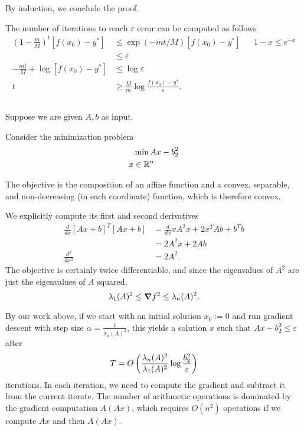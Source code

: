 \documentclass[10pt]{article}
\let\norm\relax
\DeclarePairedDelimiter{\norm}{\lVert}{\rVert}
\newcommand{\R}{\mathbb{R}}
\begin{document}
By induction,
we conclude the proof.

The number of iterations to reach $\varepsilon$ error can be computed as follows
\begin{align*}
  \left( 1-\frac{m}M \right)^t [f(x_0) - y^*]
  &\leq \exp(-mt/M) [f(x_0) - y^*] &&1-x\leq e^{-x} \\
  &\leq \varepsilon \\
  -\frac{mt}{M} + \log[f(x_0) - y^*] &\leq \log \varepsilon \\
  t &\geq \frac{M}{m} \log\frac{f(x_0) - y^*}{\varepsilon}.
\end{align*}

\subsection{}
Suppose we are given $A, b$ as input.

Consider the minimization problem
\begin{align*}
  &\min \norm{Ax - b}_2^2 \\
  x &\in \R^n
\end{align*}

The objective is the composition of an affine function
and a convex, separable, and non-decreasing (in each coordinate) function,
which is therefore convex.

We explicitly compute its first and second derivatives
\begin{align*}
  \frac{d}{dx} [Ax+b]^T[Ax + b]
  &= \frac{d}{dx} xA^2x + 2x^TAb + b^Tb \\
  &= 2 A^2x + 2Ab \\
  \frac{d^2}{dx^2}
  &= 2A^2.
\end{align*}
The objective is certainly twice differentiable,
and since the eigenvalues of $A^2$ are just the eigenvalues of $A$ squared,
\[
  \lambda_1(A)^2 \leq \grad f^2 \leq \lambda_n(A)^2.
\]

By our work above,
if we start with an initial solution $x_0 := 0$
and run gradient descent with step size $\alpha = \frac1{\lambda_n(A)^2}$,
this yields a solution $x$ such that $\norm{Ax-b}_2^2 \leq \varepsilon$ after
\[
  T = O\left( \frac{\lambda_n(A)^2}{\lambda_1(A)^2} \log\frac{\norm{b}_2^2}{\varepsilon} \right)
\]
iterations.
In each iteration,
we need to compute the gradient and subtract it from the current iterate.
The number of arithmetic operations is dominated by the gradient computation $A(Ax)$,
which requires $O(n^2)$ operations if we compute $Ax$ and then $A(Ax)$.
\end{document}
